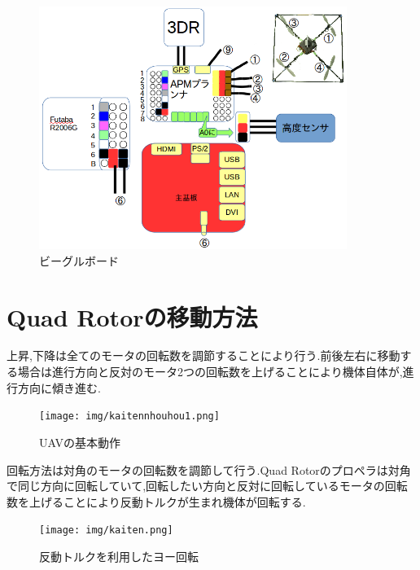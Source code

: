\documentclass[12pt,oneside]{sotsuken_paper}
\begin{document}
\begin{figure}[H]
\begin{center}
\includegraphics[width=100mm]{img/haisenzu1.png}
\end{center}
\caption{ビーグルボード}
\label{fig:haisenzu1}
\end{figure}


\section{Quad Rotorの移動方法}
上昇,下降は全てのモータの回転数を調節することにより行う.前後左右に移動する場合は進行方向と反対のモータ2つの回転数を上げることにより機体自体が,進行方向に傾き進む.

\begin{figure}[H]
\begin{center}
\texttt{[image: img/kaitennhouhou1.png]}
\end{center}
\caption{UAVの基本動作}
\label{fig:kaitennhouhou1}
\end{figure}

回転方法は対角のモータの回転数を調節して行う.Quad Rotorのプロペラは対角で同じ方向に回転していて,回転したい方向と反対に回転しているモータの回転数を上げることにより反動トルクが生まれ機体が回転する.

\begin{figure}[H]
\begin{center}
\texttt{[image: img/kaiten.png]}
\end{center}
\caption{反動トルクを利用したヨー回転}
\label{fig:kaiten}
\end{figure}
\end{document}

